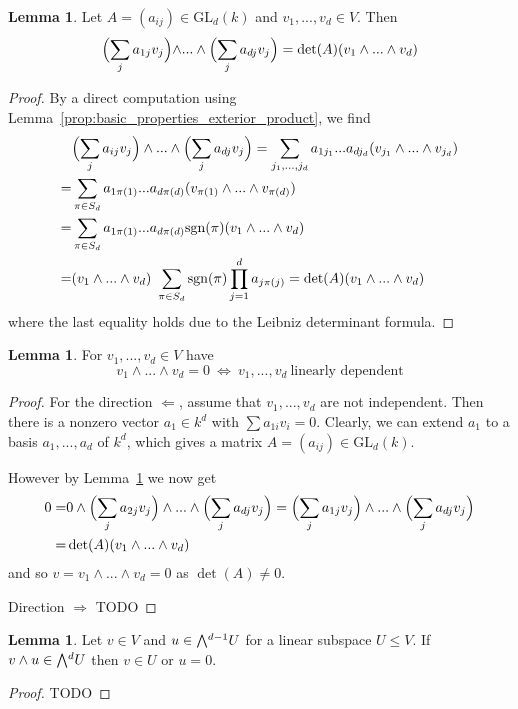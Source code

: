 \documentclass{scrartcl}
\newcommand{\GL}{\mathrm{GL}}
\newcommand{\sgn}{\mathrm{sgn}}
\newcommand{\extpow}{\mathchoice{{\textstyle\bigwedge}}
    {{\bigwedge}}
    {{\textstyle\wedge}}
    {{\scriptstyle\wedge}}}
\theoremstyle{definition}
\newtheorem{lemma}[definition]{Lemma}
\begin{document}
\begin{lemma}
    \label{prop:linear_transform_extpow}
    Let $A = (a_{ij}) \in \GL_d(k)$ and $v_1, ..., v_d \in V$.
    Then
    \begin{equation*}
        \Bigl( \sum_j a_{1j}v_j \Bigl) \wedge ... \wedge \Bigl( \sum_{j} a_{dj} v_j \Bigr) = \det(A) (v_1 \wedge ... \wedge v_d)
    \end{equation*}
\end{lemma}
\begin{proof}
    By a direct computation using Lemma~\ref{prop:basic_properties_exterior_product}, we find
    \begin{align*}
        &\Bigl( \sum_j a_{ij} v_j \Bigr) \wedge ... \wedge \Bigl( \sum_j a_{dj} v_j \Bigr) = \sum_{j_1, ..., j_d} a_{1j_1} ... a_{dj_d} (v_{j_1} \wedge ... \wedge v_{j_d}) \\
        = &\sum_{\pi \in S_d} a_{1\pi(1)} ... a_{d\pi(d)} (v_{\pi(1)} \wedge ... \wedge v_{\pi(d)}) \\
        = &\sum_{\pi \in S_d} a_{1\pi(1)} ... a_{d\pi(d)} \sgn(\pi) (v_1 \wedge ... \wedge v_d) \\
        = &(v_1 \wedge ... \wedge v_d) \ \sum_{\pi \in S_d} \sgn(\pi) \prod_{j = 1}^d a_{j\pi(j)} = \det(A) (v_1 \wedge ... \wedge v_d)
    \end{align*}
    where the last equality holds due to the Leibniz determinant formula.
\end{proof}
\begin{lemma}
    \label{prop:extpow_zero_iff_independent}
    For $v_1, ..., v_d \in V$ have
    \begin{equation*}
        v_1 \wedge ... \wedge v_d = 0 \ \Leftrightarrow \ v_1, ..., v_d \ \text{linearly dependent}
    \end{equation*}
\end{lemma}
\begin{proof}
    For the direction $\Leftarrow$, assume that $v_1, ..., v_d$ are not independent. 
    Then there is a nonzero vector $a_1 \in k^d$ with $\sum a_{1i} v_i = 0$.
    Clearly, we can extend $a_1$ to a basis $a_1, ..., a_d$ of $k^d$, which gives a matrix $A = (a_{ij}) \in \GL_d(k)$.

    However by Lemma~\ref{prop:linear_transform_extpow} we now get
    \begin{align*}
        0 =& 0 \wedge \Bigl( \sum_j a_{2j} v_j \Bigr) \wedge ... \wedge \Bigl( \sum_j a_{dj} v_j \Bigr) = \Bigl( \sum_j a_{1j} v_j \Bigr) \wedge ... \wedge \Bigl( \sum_j a_{dj} v_j \Bigr) \\
        =& \det(A) (v_1 \wedge ... \wedge v_d)
    \end{align*}
    and so $v = v_1 \wedge ... \wedge v_d = 0$ as $\det(A) \neq 0$.

    Direction $\Rightarrow$ TODO
\end{proof}
\begin{lemma}
    \label{prop:subspace_closed}
    Let $v \in V$ and $u \in \extpow^{d - 1} U$ for a linear subspace $U \leq V$. 
    If $v \wedge u \in \extpow^d U$ then $v \in U$ or $u = 0$.
\end{lemma}
\begin{proof}
    TODO
\end{proof}
\end{document}
